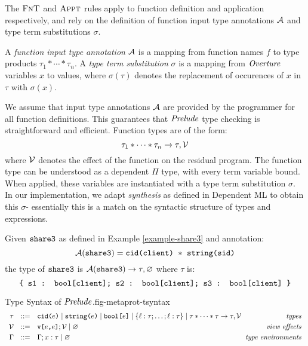 The $\text{\sc FnT}$ and $\text{\sc Appt}$ rules apply to function
definition and application respectively, and rely on the
definition of function input type annotations $\mathcal{A}$ and
type term substitutions $\sigma$. 
\begin{definition}
  A \emph{function input type annotation} $\mathcal{A}$ is a mapping from
  function names $f$ to type products $\tau_1 * \cdots * \tau_n$.
  A \emph{type term substitution} $\sigma$ is a mapping from
  $\mathit{Overture}$ variables $x$ to values, where $\sigma(\tau)$ denotes
  the replacement of occurences of $x$ in $\tau$ with $\sigma(x)$. 
\end{definition}
We assume that input type annotations $\mathcal{A}$ are provided by the
programmer for all function definitions. This guarantees that
$\mathit{Prelude}$ type checking is straightforward and efficient.
Function types are of the form:
$$
\tau_1 * \cdots * \tau_n \rightarrow \tau,\mathcal{V}
$$
where $\mathcal{V}$ denotes the effect of the function on the residual
program.  The function type can be understood as a dependent $\Pi$
type, with every term variable bound. When applied, these variables
are instantiated with a type term substitution $\sigma$. In our
implementation, we adapt \emph{synthesis} as defined in Dependent ML \cite{10.1145/292540.292560}
to obtain this $\sigma$- essentially this is a match on the syntactic
structure of types and expressions. 
\begin{example}
  Given $\texttt{share3}$ as defined in Example \ref{example-share3} and
  annotation:
  $$\mathcal{A}(\texttt{share3}) =  \texttt{cid(client)}\ *\ \texttt{string(sid)}$$
  the type of $\texttt{share3}$ is $\mathcal{A}(\texttt{share3}) \rightarrow \tau,\varnothing$
  where $\tau$ is:
  $$
  \texttt{\{ s1 : bool[client]; s2 : bool[client]; s3 : bool[client] \}}
  $$
\end{example}

\begin{fpfig}[t]{Type Syntax of $\mathit{Prelude}$.}{fig-metaprot-tsyntax}
  {\small
    $$
    \begin{array}{rcl@{\hspace{2mm}}r}
      \srct &::=& \cidty{e} \mid \stringty{e} \mid \bet{e} \mid  \{ \flab : \srct;\ldots;\flab : \srct \} \mid \tau * \cdots * \tau \rightarrow \tau,\viewst & \gdesc{types}\\ [1mm]
      \viewst  &::=& \view{e}{e};\viewst \mid \varnothing   & \gdesc{view effects}\\[1mm]
      \Gamma &::=& \Gamma; x : \tau \mid \varnothing & \gdesc{type environments}    
    \end{array}
    $$
  }
\end{fpfig}

